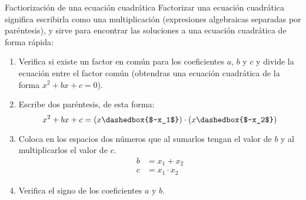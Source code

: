 \begin{infocard}{Factiorización de una ecuación cuadrática}
    Factorizar una ecuación cuadrática significa escribirla como una multiplicación (expresiones algebraicas separadas por paréntesis), y sirve para encontrar las soluciones a una ecuación cuadrática de forma rápida:
    \begin{enumerate}
        \item Verifica si existe un factor en común para los coeficientes $a$, $b$ y $c$ y divide la ecuación entre el factor común (obtendras una ecuación cuadrática de la forma $x^2+bx+c=0$).
        \item Escribe dos paréntesis, de esta forma:
              \[ x^2+bx+c = \left(x \dashedbox{$-x_1$}\right)\cdot\left(x \dashedbox{$-x_2$}\right)                  \]
        \item Coloca en los espacios dos números que al sumarlos tengan el valor de $b$ y al multiplicarlos el valor de $c$.
              \[
                  \begin{array}{rl}
                      b & = x_1 + x_2     \\
                      c & = x_1 \cdot x_2
                  \end{array}
              \]
        \item Verifica el signo de los coeficientes $a$ y $b$.
    \end{enumerate}
\end{infocard}
